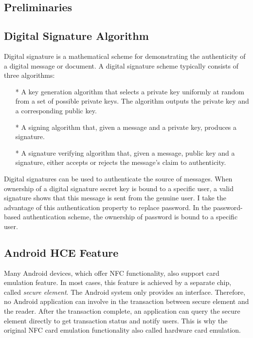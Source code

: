 \begin{CJK}{Bg5}{bsmi}


\chapter{Preliminaries}

\section{Digital Signature Algorithm}

Digital signature is a mathematical scheme for demonstrating the authenticity of a digital message or document. A digital signature scheme typically consists of three algorithms:

\begin{enumerate}
\item[*] A key generation algorithm that selects a private key uniformly at random from a set of possible private keys. The algorithm outputs the private key and a corresponding public key.
\item[*] A signing algorithm that, given a message and a private key, produces a signature.
\item[*] A signature verifying algorithm that, given a message, public key and a signature, either accepts or rejects the message's claim to authenticity.
\end{enumerate}

Digital signatures can be used to authenticate the source of messages. When ownership of a digital signature secret key is bound to a specific user, a valid signature shows that this message is sent from the genuine user. I take the advantage of this authentication property to replace password. In the password-based authentication scheme, the ownership of password is bound to a specific user. 

\section{Android HCE Feature}

Many Android devices, which offer NFC functionality, also support card emulation feature. In most cases, this feature is achieved by a separate chip, called \emph{secure element}. The Android system only provides an interface. Therefore, no Android application can involve in the transaction between secure element and the reader. After the transaction complete, an application can query the secure element directly to get transaction status and notify users. This is why the original NFC card emulation functionality also called hardware card emulation.


\end{CJK}
